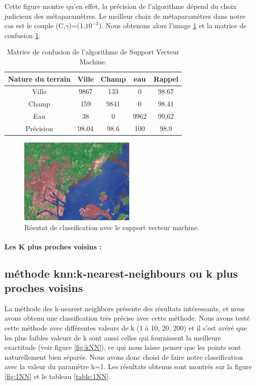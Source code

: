 \documentclass[a4paper,10pt]{report}
\begin{document}
Cette figure montre qu'en effet, la précision de l'algorithme dépend du choix judicieux des métaparamètres. Le meilleur choix de métaparamètres dans notre cas est le couple (C,$\gamma$)=(1,$ 10^{-3}$). Nous obtenons alors l'image \ref{fig:veniseSVM} et la matrice de confusion \ref{table:SVC}.

\begin{table}
\begin{center}
 \begin{tabular}{|c|c|c|c|c|}
  \hline
  Nature du terrain & Ville & Champ & eau & Rappel \\
  \hline
Ville & 9867 & 133 & 	0 &	98.67 \\
Champ & 159 &	9841 &	0 &	98.41 \\
Eau &  38 &	0 &	9962 &	99,62 \\
Précision & 98.04 & 98.6 & 100 & 98.9 \\
  \hline
  \end{tabular}
\end{center}
\label{table:SVC}
\caption{Matrice de confusion de l'algorithme de Support Vecteur Machine.}
\end{table}

\begin{figure}
  \centering
    \includegraphics[width=0.5\textwidth]{veniseSVM}
  \caption{Résutat de classification avec le support vecteur machine.}
  \label{fig:veniseSVM}
\end{figure}


\paragraph{Les K plus proches voisins :}
\subsection{méthode knn:k-nearest-neighbours ou k plus proches voisins}
La méthode des k-nearest neighbors présente des résultats intéressants, et nous avons obtenu une classification très précise avec cette méthode. Nous avons testé cette méthode avec différentes valeurs de k (1 à 10, 20, 200) et il s'est avéré que les plus faibles valeurs de k sont aussi celles qui fournissent la meilleure exactitude (voir figure \ref{fig:kNN}), ce qui nous laisse penser que les points sont naturellement bien séparés. Nous avons donc choisi de faire notre classification avec la valeur du paramètre k=1. Les résultats obtenus sont montrés sur la figure \ref{fig:1NN} et le tableau \ref{table:1NN}.
\end{document}

